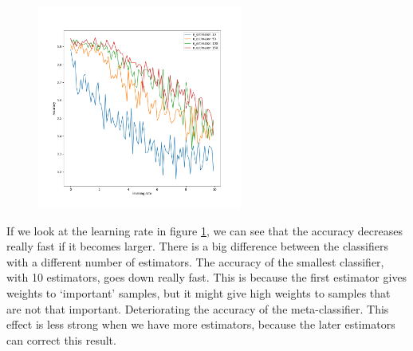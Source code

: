 \documentclass[11pt]{article}
\begin{document}
\begin{figure}[h]
	\centering
	\includegraphics[width=0.6\textwidth]{images/ex2_5_lr_estimators}
	\caption{}
	\label{fig:lr}
\end{figure}



If we look at the learning rate in figure \ref{fig:lr}, we can see that the accuracy decreases really fast if it becomes larger. There is a big difference between the classifiers with a different number of estimators. The accuracy of the smallest classifier, with 10 estimators, goes down really fast. This is because the first estimator gives weights to `important' samples, but it might give high weights to samples that are not that important. Deteriorating the accuracy of the meta-classifier.
This effect is less strong when we have more estimators, because the later estimators can correct this result.
\end{document}
